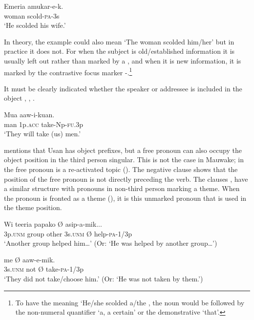\ea%
\label{ex:3:x556}
\gll Emeria amukar-e-k. \\
woman scold-\textsc{pa}-3s\\
\glt`He scolded his wife.'
\z

In theory, the example  could also mean `The woman scolded him/her' but in practice it does not. For when the subject is old/established information it is usually left out rather than marked by a , and when it is new information, it is marked by the contrastive focus marker -.\footnote{To have the meaning `He/she scolded a/the , the noun would be followed by the non-numeral quantifier  `a, a certain' or the demonstrative  `that'.}

It must be clearly indicated whether the speaker or addressee is included in the object , , .

\ea%
\label{ex:3:x557}
\gll Mua  aaw-i-kuan. \\
man 1p.\textsc{acc} take-Np-\textsc{fu}.3p\\
\glt`They will take (us) men.'
\z

\citet[52--53]{Reesink1987} mentions that Usan has object prefixes, but a free pronoun can also occupy the object position in the third person singular. This is not the case in Mauwake; in  the free pronoun  is a re-activated topic (). The negative clause  shows that the position of the free pronoun is not directly preceding the verb. The clauses ,  have a similar structure with pronouns in non-third person marking a theme. When the pronoun is fronted as a theme (), it is this unmarked pronoun that is used in the theme position. 

\ea%
\label{ex:3:x1354}
\gll Wi teeria papako  {\O} asip-a-mik... \\
3p.\textsc{unm} group other 3s.\textsc{unm} {\O} help-\textsc{pa}-1/3p\\
\glt`Another group helped him{\dots}' (Or: `He was helped by another group{\dots}')
\z

\ea%
\label{ex:3:x1353}
\gll {} me {\O} aaw-e-mik. \\
3s.\textsc{unm} not {\O} take-\textsc{pa}-1/3p\\
\glt`They did not take/choose him.' (Or: `He was not taken by them.')
\z


